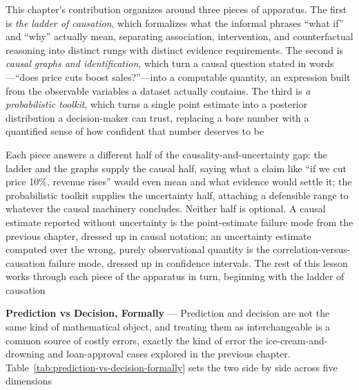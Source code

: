 This chapter's contribution organizes around three pieces of apparatus. The
first is \emph{the ladder of causation}, which formalizes what the informal
phrases ``what if'' and ``why'' actually mean, separating association,
intervention, and counterfactual reasoning into distinct rungs with distinct evidence
requirements. The second is \emph{causal graphs and identification}, which turn
a causal question stated in words—``does price cuts boost sales?''—into a computable
quantity, an expression built from the observable variables a dataset actually
contains. The third is \emph{a probabilistic toolkit}, which turns a single point
estimate into a posterior distribution a decision-maker can trust, replacing a
bare number with a quantified sense of how confident that number deserves to be

Each piece answers a different half of the causality-and-uncertainty gap: the
ladder and the graphs supply the causal half, saying what a claim like ``if we cut
price 10\%, revenue rises'' would even mean and what evidence would settle it;
the probabilistic toolkit supplies the uncertainty half, attaching a defensible range
to whatever the causal machinery concludes. Neither half is optional. A causal estimate
reported without uncertainty is the point-estimate failure mode from the previous
chapter, dressed up in causal notation; an uncertainty estimate computed over the
wrong, purely observational quantity is the correlation-versus-causation failure
mode, dressed up in confidence intervals. The rest of this lesson works through
each piece of the apparatus in turn, beginning with the ladder of causation

\textbf{Prediction vs Decision, Formally} --- Prediction and decision are not the
same kind of mathematical object, and treating them as interchangeable is a
common source of costly errors, exactly the kind of error the ice-cream-and-drowning
and loan-approval cases explored in the previous chapter. Table~\ref{tab:prediction-vs-decision-formally}
sets the two side by side across five dimensions

